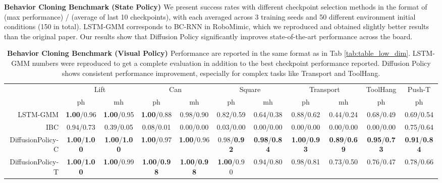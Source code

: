 \documentclass[Afour,sageh,times]{sagej}
\begin{document}
\begin{table}[h]
{\caption{\textbf{Behavior Cloning Benchmark (State Policy) \label{tab:table_low_dim} }
We present success rates with different checkpoint selection methods in the format of (max performance) / (average of last 10 checkpoints), with each averaged across 3 training seeds and 50 different environment initial conditions (150 in total).
LSTM-GMM corresponds to BC-RNN in RoboMimic\cite{robomimic}, which we reproduced and obtained slightly {better} results than the original paper. Our results show that Diffusion Policy significantly improves state-of-the-art performance across the board.
}
\vspace{2mm}






\setlength\tabcolsep{ 3 pt}
\begin{tabular}{r|cc|cc|cc|cc|c|c}
\toprule
 & \multicolumn{2}{c|}{Lift} & \multicolumn{2}{c|}{Can} & \multicolumn{2}{c|}{Square} & \multicolumn{2}{c|}{Transport} & \multicolumn{1}{c|}{ToolHang} & \multicolumn{1}{c}{Push-T} \\
 & ph & mh & ph & mh & ph & mh & ph & mh & ph & ph \\
\midrule
LSTM-GMM & \small \textbf{1.00}/0.96 & \small \textbf{1.00}/0.95 & \small \textbf{1.00}/0.88 & \small 0.98/0.90 & \small 0.82/0.59 & \small 0.64/0.38 & \small 0.88/0.62 & \small 0.44/0.24 & \small 0.68/0.49 & \small 0.69/0.54 \\
IBC & \small 0.94/0.73 & \small 0.39/0.05 & \small 0.08/0.01 & \small 0.00/0.00 & \small 0.03/0.00 & \small 0.00/0.00 & \small 0.00/0.00 & \small 0.00/0.00 & \small 0.00/0.00 & \small 0.75/0.64 \\
DiffusionPolicy-C & \small \textbf{1.00}/\textbf{1.00} & \small \textbf{1.00}/\textbf{1.00} & \small \textbf{1.00}/0.97 & \small \textbf{1.00}/0.96 & \small 0.98/\textbf{0.92} & \small \textbf{0.98}/\textbf{0.84} & \small \textbf{1.00}/\textbf{0.93} & \small \textbf{0.89}/\textbf{0.69} & \small \textbf{0.95}/\textbf{0.73} & \small \textbf{0.91}/\textbf{0.84} \\
DiffusionPolicy-T & \small \textbf{1.00}/\textbf{1.00} & \small \textbf{1.00}/0.99 & \small \textbf{1.00}/\textbf{0.98} & \small \textbf{1.00}/\textbf{0.98} & \small \textbf{1.00}/0.90 & \small 0.94/0.80 & \small 0.98/0.81 & \small 0.73/0.50 & \small 0.76/0.47 & \small 0.78/0.66 \\
\bottomrule
\end{tabular}
\caption{\textbf{Behavior Cloning Benchmark (Visual Policy) \label{tab:table_image}} Performance are reported in the same format as in Tab \ref{tab:table_low_dim}. LSTM-GMM numbers were reproduced to get a complete evaluation in addition to the best checkpoint performance reported. Diffusion Policy shows consistent performance improvement, especially for complex tasks like Transport and ToolHang. }
}
\end{table}
\end{document}
